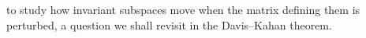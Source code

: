 \documentclass[14pt,letterpaper]{article}
\theoremstyle{plain}
\theoremstyle{definition}
\theoremstyle{remark}
\newcommand{\R}{\mathbb{R}}
\begin{document}
to study how invariant subspaces move when the matrix
defining them is perturbed, a question we shall revisit
in the Davis--Kahan theorem.

\end{document}
